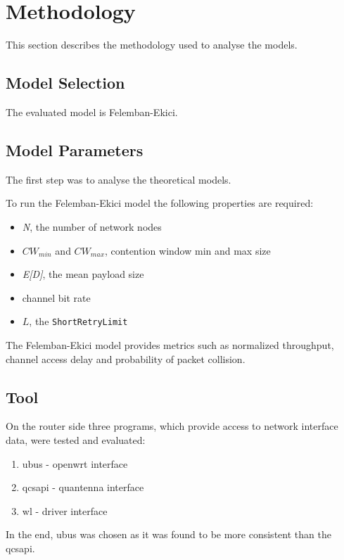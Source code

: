\chapter{Methodology}

This section describes the methodology used to analyse the models.

\section{Model Selection}

The evaluated model is Felemban-Ekici.

\section{Model Parameters}
The first step was to analyse the theoretical models.

To run the Felemban-Ekici model the following properties are required:

\begin{itemize}
	\item \emph{N}, the number of network nodes
	\item $CW_{min}$ and $CW_{max}$, contention window min and max size
	\item \emph{E[D]}, the mean payload size
	\item channel bit rate
	\item $L$, the \texttt{ShortRetryLimit}
\end{itemize}

The Felemban-Ekici model provides metrics such as normalized throughput, channel access delay and probability of packet collision.

\section{Tool}

On the router side three programs, which provide access to network interface data, were tested and evaluated:

\begin{enumerate}
	\item ubus - openwrt interface
	\item qcsapi - quantenna interface
	\item wl - driver interface
\end{enumerate}

In the end, ubus was chosen as it was found to be more consistent than the qcsapi.

